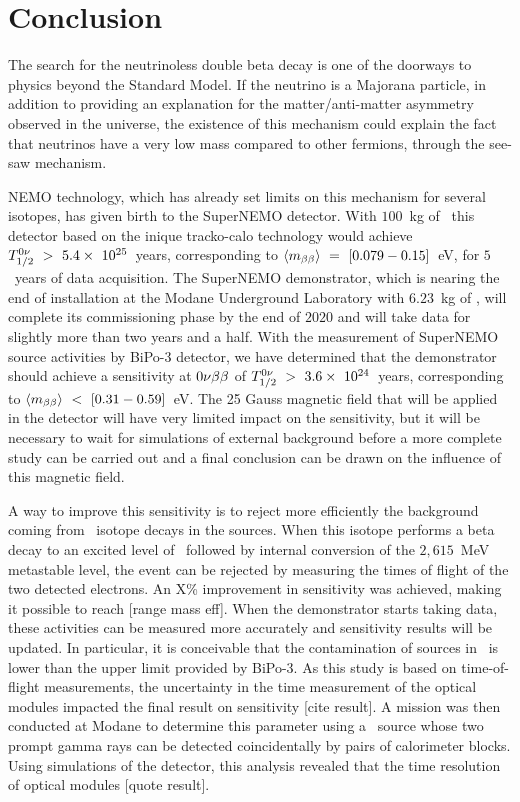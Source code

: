 \chapter*{Conclusion}
\label{ch:conclu}

The search for the neutrinoless double beta decay is one of the doorways to physics beyond the Standard Model.
If the neutrino is a Majorana particle, in addition to providing an explanation for the matter/anti-matter asymmetry observed in the universe, the existence of this mechanism could explain the fact that neutrinos have a very low mass compared to other fermions, through the see-saw mechanism.

NEMO technology, which has already set limits on this mechanism for several isotopes, has given birth to the SuperNEMO detector.
With $100$~kg of \Se\ this detector based on the inique tracko-calo technology would achieve $T_{1/2}^{0\nu}~>~5.4\times~10^{25}$~years, corresponding to $\langle m_{\beta\beta}\rangle~=~[0.079-0.15]$~eV, for $5$~years of data acquisition.
The SuperNEMO demonstrator, which is nearing the end of installation at the Modane Underground Laboratory with $6.23$~kg of \Se, will complete its commissioning phase by the end of $2020$ and will take data for slightly more than two years and a half.
With the measurement of SuperNEMO source activities by BiPo-$3$ detector, we have determined that the demonstrator should achieve a sensitivity at $0\nu\beta\beta$ of $T_{1/2}^{0\nu}~>~3.6\times~10^{24}$~years, corresponding to $\langle m_{\beta\beta}\rangle~<~[0.31-0.59]$~eV.
The 25 Gauss magnetic field that will be applied in the detector will have very limited impact on the sensitivity, but it will be necessary to wait for simulations of external background before a more complete study can be carried out and a final conclusion can be drawn on the influence of this magnetic field.

A way to improve this sensitivity is to reject more efficiently the background coming from \Tl\ isotope decays in the sources.
When this isotope performs a beta decay to an excited level of \Pb\ followed by internal conversion of the $2,615$~MeV metastable level, the event can be rejected by measuring the times of flight of the two detected electrons.
An X\% improvement in sensitivity was achieved, making it possible to reach [range mass eff].
When the demonstrator starts taking data, these activities can be measured more accurately and sensitivity results will be updated.
In particular, it is conceivable that the contamination of sources in \Bi\ is lower than the upper limit provided by BiPo-$3$.
As this study is based on time-of-flight measurements, the uncertainty in the time measurement of the optical modules impacted the final result on sensitivity [cite result].
A mission was then conducted at Modane to determine this parameter using a \Co\ source whose two prompt gamma rays can be detected coincidentally by pairs of calorimeter blocks.
Using simulations of the detector, this analysis revealed that the time resolution of optical modules [quote result].


